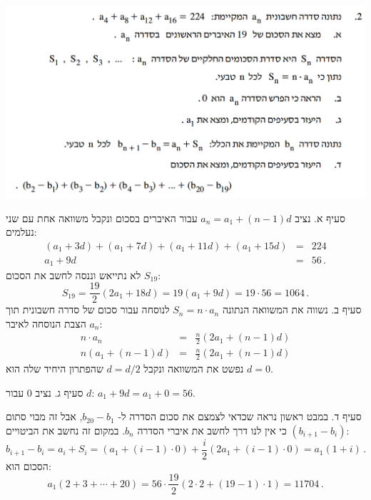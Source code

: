 \documentclass[12pt,a4paper]{article}
\begin{document}
\begin{center}
\includegraphics[width=.95\textwidth]{summer-2016a-2}
\end{center}
\vspace{-2ex}
סעיף א. נציב
$a_n=a_1+(n-1)d$
עבור האיברים בסכום ונקבל משוואה אחת עם שני נעלמים:
\begin{eqnarray*}
(a_1+3d)+(a_1+7d)+(a_1+11d)+(a_1+15d)&=&224\\
a_1+9d&=&56\,.
\end{eqnarray*}
לא נתייאש וננסה לחשב את הסכום
$S_{19}$:
\[
S_{19}=\frac{19}{2}(2a_1+18d) = 19(a_1+9d)=19\cdot 56 = 1064\,.
\]
סעיף ב. נשווה את המשוואה הנתונה
$S_n=n\cdot a_n$
לנוסחה עבור סכום של סדרה חשבונית תוך הצבת הנוסחה לאיבר
$a_n$:
\begin{eqnarray*}
n\cdot a_n &=& \frac{n}{2}(2a_1+(n-1)d)\\
n(a_1+(n-1)d) &=&\frac{n}{2}(2a_1+(n-1)d)
\end{eqnarray*}
נפשט את המשוואה ונקבל 
$d=d/2$
שהפתרון היחיד שלה הוא
$d=0$.

סעיף ג. נציב
$0$
עבור 
$d$:
$a_1+9d=a_1+0=56$.

סעיף ד. במבט ראשון נראה שכדאי לצמצם את סכום הסדרה  ל-%
$b_{20}-b_1$,
אבל זה מבוי סתום כי אין לנו דרך לחשב את איברי הסדרה
$b_n$.
במקום זה נחשב את הביטויים
$(b_{i+1}-b_i)$:
\[
b_{i+1}-b_i=a_i+S_i=(a_1+(i-1)\cdot 0)+\frac{i}{2}(2a_1+(i-1)\cdot 0)=a_1(1+i)\,.
\]
הסכום הוא:
\[
a_1(2+3+\cdots+20)=56\cdot\frac{19}{2}(2\cdot 2 + (19-1)\cdot 1)=11704\,.
\]
\vspace{-4ex}


\bigskip

\textbf{}
\end{document}
